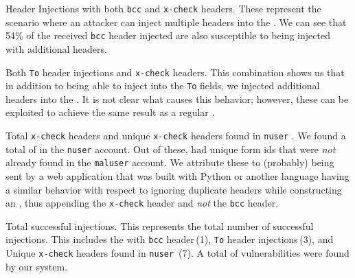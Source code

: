 \Email Header Injections with both \texttt{bcc} and \texttt{x-check}
headers. These represent the scenario where an attacker can inject
multiple headers into the \emails. We can see that 54\% of the
received \texttt{bcc} header injected \emails are also susceptible to
being injected with additional headers.
	
Both \texttt{To} header injections and \texttt{x-check} headers. This
combination shows us that in addition to being able to inject into the
\texttt{To} fields, we injected additional headers into the \email. It
is not clear what causes this behavior; however, these can be
exploited to achieve the same result as a regular \ehi.
	
Total \texttt{x-check} headers and unique \texttt{x-check} headers
found in \texttt{nuser} \emails. We found a total of \ehinuserxcheck
\emails in the \texttt{nuser} account. Out of these,
\ehiuniquenuserxcheck had unique form ids that were \emph{not} already
found in the \texttt{maluser} account. We attribute these \emails to
(probably) being sent by a web application that was built with Python
or another language having a similar behavior with respect to ignoring
duplicate headers while constructing an \email, thus appending the
\texttt{x-check} header and \emph{not} the \texttt{bcc} header.
	
Total successful injections. This represents the total number of
successful injections. This includes the \ehi with \texttt{bcc}
header\,(1), \texttt{To} header injections\,(3), and Unique
\texttt{x-check} headers found in \texttt{nuser} \emails\,(7). A total
of \success vulnerabilities were found by our system.


